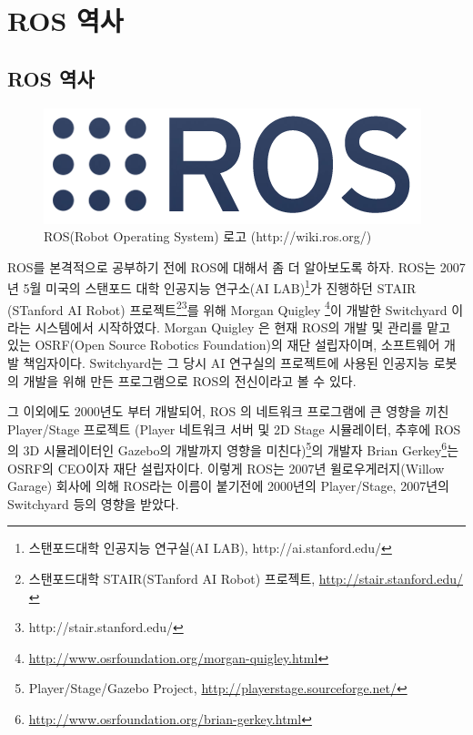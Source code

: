 \section{ROS 역사}

\subsection{ROS 역사}

\begin{figure}[h]
\centering\includegraphics[width=0.5\columnwidth]{pictures/chapter1/roslogo.png}
\caption{ROS(Robot Operating System) 로고 (http://wiki.ros.org/)}
\end{figure}

ROS를 본격적으로 공부하기 전에 ROS에 대해서 좀 더 알아보도록 하자. ROS는 2007년 5월 미국의 스탠포드 대학 인공지능 연구소(AI LAB)\footnote{스탠포드대학 인공지능 연구실(AI LAB), http://ai.stanford.edu/}가 진행하던 STAIR (STanford AI Robot) 프로젝트\footnote{스탠포드대학 STAIR(STanford AI Robot) 프로젝트, \url{http://stair.stanford.edu/}}\footnote{http://stair.stanford.edu/}를 위해 Morgan Quigley \footnote{\url{http://www.osrfoundation.org/morgan-quigley.html}}이 개발한 Switchyard 이라는 시스템에서 시작하였다. Morgan Quigley 은 현재 ROS의 개발 및 관리를 맡고 있는 OSRF(Open Source Robotics Foundation)의 재단 설립자이며, 소프트웨어 개발 책임자이다. Switchyard는 그 당시 AI 연구실의 프로젝트에 사용된 인공지능 로봇의 개발을 위해 만든 프로그램으로 ROS의 전신이라고 볼 수 있다.

그 이외에도 2000년도 부터 개발되어, ROS 의 네트워크 프로그램에 큰 영향을 끼친 Player/Stage 프로젝트 (Player 네트워크 서버 및 2D Stage 시뮬레이터, 추후에 ROS의 3D 시뮬레이터인 Gazebo의 개발까지 영향을 미친다)\footnote{Player/Stage/Gazebo Project, \url{http://playerstage.sourceforge.net/}}의 개발자 Brian Gerkey\footnote{\url{http://www.osrfoundation.org/brian-gerkey.html}}는 OSRF의 CEO이자 재단 설립자이다. 이렇게 ROS는 2007년 윌로우게러지(Willow Garage) 회사에 의해 ROS라는 이름이 붙기전에 2000년의 Player/Stage, 2007년의 Switchyard 등의 영향을 받았다.

